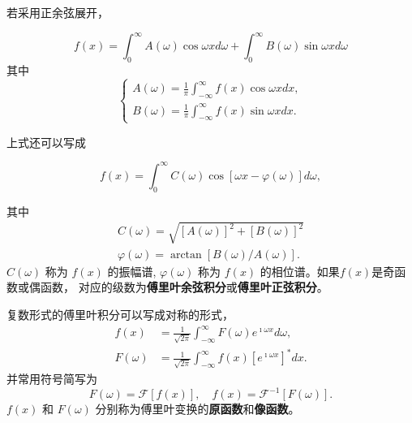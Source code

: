 若采用正余弦展开，

\begin{equation}
    f(x) =\int_{0}^{\infty} A(\omega) \cos {\omega x} d\omega + \int_{0}^{\infty} B(\omega) \sin {\omega x} d\omega
\end{equation}
其中
\begin{equation}
    \left\{\begin{array}{l}
    A(\omega)=\frac{1}{\pi} \int_{-\infty}^{\infty} f(x) \cos \omega x d x, \\
    B(\omega)=\frac{1}{\pi} \int_{-\infty}^{\infty} f(x) \sin \omega x d x .
    \end{array}\right.
\end{equation}

上式还可以写成

\begin{equation}
    f(x)=\int_0^{\infty} C(\omega) \cos [\omega x-\varphi(\omega)] d \omega,
\end{equation}

其中
$$
\begin{gathered}
C(\omega)=\sqrt{[A(\omega)]^2+[B(\omega)]^2} \\
\varphi(\omega)=\arctan [B(\omega) / A(\omega)] .
\end{gathered}
$$
$C(\omega)$ 称为 $f(x)$ 的振幅谱, $\varphi(\omega)$ 称为 $f(x)$ 的相位谱。如果$f(x)$是奇函数或偶函数，
对应的级数为\textbf{傅里叶余弦积分}或\textbf{傅里叶正弦积分}。

复数形式的傅里叶积分可以写成对称的形式，
\begin{equation}
    \begin{aligned}
    f(x) & =\frac{1}{\sqrt{2 \pi}} \int_{-\infty}^{\infty} F(\omega)e^{\imath \omega x} d \omega, \\
    F(\omega) & =\frac{1}{\sqrt{2 \pi}} \int_{-\infty}^{\infty} f(x)\left[e^{\imath \omega x}\right]^* d x .
    \end{aligned}
\end{equation}
并常用符号简写为
$$
F(\omega)=\mathcal{F}[f(x)], \quad f(x)=\mathcal{F}^{-1}[F(\omega)] .
$$
$f(x)$ 和 $F(\omega)$ 分别称为傅里叶变换的\textbf{原函数}和\textbf{像函数}。

